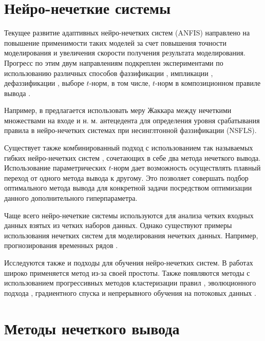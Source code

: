 \section{Нейро-нечеткие системы}

Текущее развитие адаптивных нейро-нечетких систем (ANFIS) направлено на повышение применимости таких моделей за счет повышения точности моделирования и увеличения скорости получения результата моделирования. Прогресс по этим двум направлениям подкреплен экспериментами по использованию различных способов фаззификации \cite{Symmetry2021, Qian2023, Pekaslan2020}, импликации \cite{Shi2013, FernandezPeralta2025, Zhang2022, fern2021}, дефаззификации \cite{VanLeekwijck1999, Nasiboglu2022}, выборе $t$-норм, в том числе, $t$-норм в композиционном правиле вывода \cite{Pourabdollah2015}.

Например, в \cite{Wagner2016} предлагается использовать меру Жаккара между нечеткими множествами на входе и н. м. антецедента для определения уровня срабатывания правила в нейро-нечетких системах при несинглтонной фаззификации (NSFLS).

Существует также комбинированный подход с использованием так называемых гибких нейро-нечетких систем \cite{rutkovskiy2010, Cingolani2012}, сочетающих в себе два метода нечеткого вывода. Использование параметрических $t$-норм дает возможность осуществлять плавный переход от одного метода вывода к другому. Это позволяет совершать подбор оптимального метода вывода для конкретной задачи посредством оптимизации данного дополнительного гиперпараметра.

Чаще всего нейро-нечеткие системы используются для анализа четких входных данных взятых из четких наборов данных. Однако существуют примеры использования нечетких систем для моделирования нечетких данных. Например, прогнозирования временных рядов \cite{Pekaslan2020, Pourabdollah2017}.

Исследуются также и подходы для обучения нейро-нечетких систем. В работах широко применяется метод \cite{Wang1992} из-за своей простоты. Также появляются методы с использованием прогрессивных методов кластеризации правил \cite{Svetlakov2021}, эволюционного подхода \cite{}, градиентного спуска \cite{} и непрерывного обучения на потоковых данных \cite{Lima2010, Alves2021}.


\section{Методы нечеткого вывода}\label{sec:ch1-fuzzy-logical-inference-problem}

